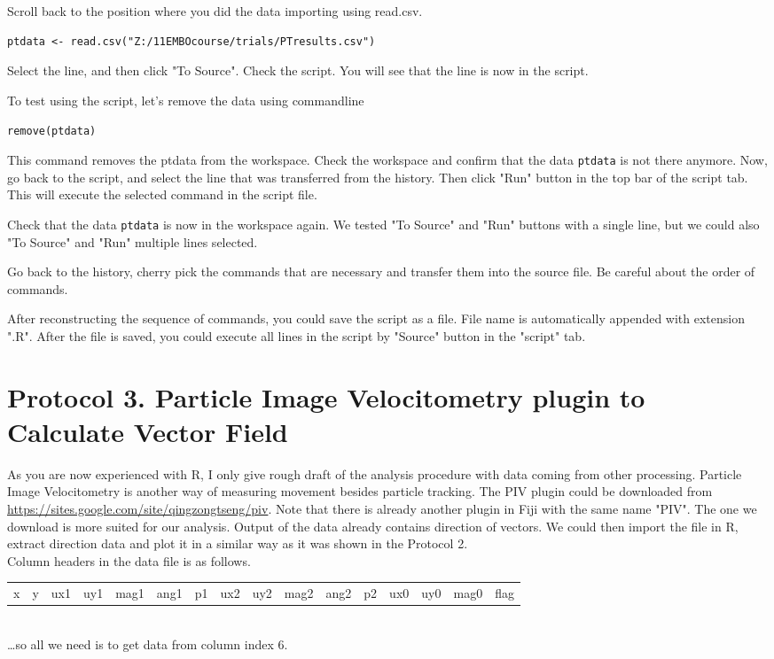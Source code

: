 \documentclass[11pnt]{article}
\begin{document}
\begin{description}
Scroll back to the position where you did the data importing using read.csv. 
\begin{verbatim}
ptdata <- read.csv("Z:/11EMBOcourse/trials/PTresults.csv")
\end{verbatim}
Select the line, and then click "To Source". Check the script. You will see that the line is now in the script.

To test using the script, let's remove the data using commandline

\verb"remove(ptdata)"

This command removes the ptdata from the workspace. Check the workspace and confirm that the data \verb"ptdata" is not there anymore. Now, go back to the script, and select the line that was transferred from the history. Then click "Run" button in the top bar of the script tab. This will execute the selected command in the script file. 

Check that the data \verb"ptdata" is now in the workspace again. We tested "To Source" and "Run" buttons with a single line, but we could also "To Source" and "Run" multiple lines selected.  
 
Go back to the history, cherry pick the commands that are necessary and transfer them into the source file. Be careful about the order of commands. 

After reconstructing the sequence of commands, you could save the script as a file. File name is automatically appended with extension ".R". After the file is saved, you could execute all lines in the script by "Source" button in the "script" tab.

\end{description}

%
%
\section{Protocol 3. Particle Image Velocitometry plugin to Calculate Vector Field}

As you are now experienced with R, I only give rough draft of the analysis procedure with data coming from other processing. Particle Image Velocitometry is another way of measuring movement besides particle tracking. The PIV plugin could be downloaded from \url{https://sites.google.com/site/qingzongtseng/piv}. Note that there is already another plugin in Fiji with the same name "PIV". The one we download is more suited for our analysis.  Output of the data already contains direction of vectors. We could then import the file in R, extract direction data and plot it in a similar way as it was shown in the Protocol 2. 
\\
Column headers in the data file is as follows.\\ 
\begin{tabular}{ l l l l l l l l l l l l l l l l}
x & y & ux1 & uy1 & mag1 & ang1 & p1 & ux2 & uy2 & mag2 & ang2 & p2 & ux0 & uy0 & mag0 & flag \\
\end{tabular}
\\
\dots so all we need is to get data from column index 6.
\end{document}
